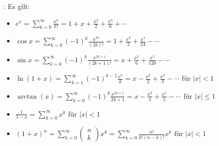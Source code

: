 \Satz {}: Es gilt:
\vspace{-0.6em}
\begin{itemize}
    \item $e^x = \sum_{k=0}^\infty \frac{x^{k}}{k!} = 1 + x + \frac{x^2}{2} + \frac{x^3}{6} + \cdots$
    \item $\cos x = \sum_{k=0}^\infty (-1)^k \frac{x^{2k}}{(2k)!} = 1 + \frac{x^2}{2} + \frac{x^4}{24} - \cdots$
    \item $\sin x = \sum_{k=0}^\infty (-1)^k \frac{x^{2k + 1}}{(2k+1)!} = x + \frac{x^3}{6} + \frac{x^5}{120} - \cdots$
    \item $\ln (1 + x) = \sum_{k=1}^\infty (-1)^{k-1} \frac{x^k}{k} = x - \frac{x^2}{2} + \frac{x^3}{3} - \cdots$ für $|x| < 1$
    \item $\arctan(x) = \sum_{k=0}^\infty (-1)^k \frac{x^{2k+1}}{2k+1} = x - \frac{x^3}{3} + \frac{x^5}{5} - \cdots$ für $|x| \le 1$
    \item $\frac{1}{1-x} = \sum_{k=0}^\infty x^k$ für $|x| < 1$
    \item $(1 + x)^n = \sum_{k=0}^\infty \begin{pmatrix}n \\ k\end{pmatrix} x^k = \sum_{k=0}^\infty \frac{n!}{k!(n-k)!}x^k$ für $|x| < 1$
\end{itemize}
